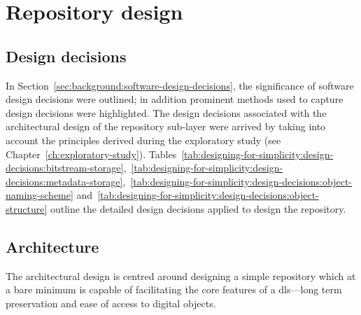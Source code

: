 \section[Repository design]{Repository design}
\label{sec:implementation:object-storage}


\subsection[Design decisions]{Design decisions}
\label{sec:implementation:simple-repository:object-identifiers}

In Section~\ref{sec:background:software-design-decisions}, the significance of software design decisions were outlined; in addition prominent methods used to capture design decisions were highlighted. The design decisions associated with the architectural design of the repository sub-layer were arrived by taking into account the principles derived during the exploratory study (see Chapter~\ref{ch:exploratory-study}). Tables~\ref{tab:designing-for-simplicity:design-decisions:bitstream-storage},~\ref{tab:designing-for-simplicity:design-decisions:metadata-storage},~\ref{tab:designing-for-simplicity:design-decisions:object-naming-scheme} and~\ref{tab:designing-for-simplicity:design-decisions:object-structure} outline the detailed design decisions applied to design the repository.

\tablespacing

\bodyspacing

\tablespacing

\bodyspacing

\tablespacing

\bodyspacing

\tablespacing

\bodyspacing

\subsection[Architecture]{Architecture}
\label{sec:implementation:simple-repository:object-storage}

The architectural design is centred around designing a simple repository which at a bare minimum is capable of facilitating the core features of a \gls{dls}---long term preservation and ease of access to digital objects.

